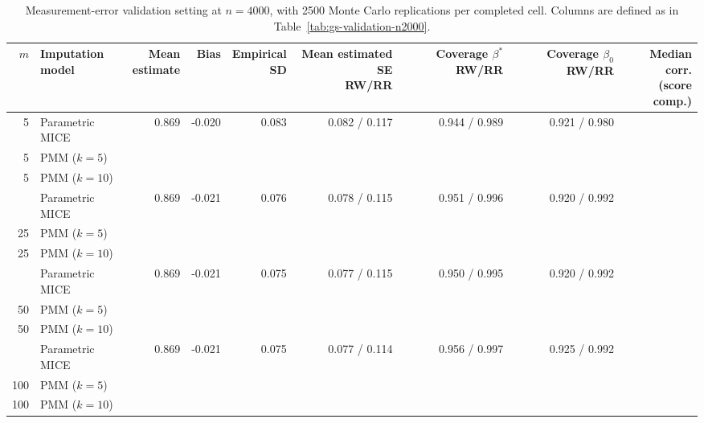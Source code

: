 \begin{table}[!htbp]
\centering
\scriptsize
\setlength{\tabcolsep}{2.5pt}
\begin{tabular}{rlrrrrrrr}
\toprule
\(m\) & \makecell{Imputation\\model} &
\makecell{Mean\\estimate} & Bias &
\makecell{Empirical\\SD} &
\makecell{Mean estimated SE\\RW/RR} &
\makecell{Coverage \(\beta^\ast\)\\RW/RR} &
\makecell{Coverage \(\beta_0\)\\RW/RR} & \makecell{Median corr.\\(score comp.)}\\
\midrule
5   & Parametric MICE & 0.869 & -0.020 & 0.083 & 0.082 / 0.117 & 0.944 / 0.989 & 0.921 / 0.980 &\\
5   & PMM (\(k=5\))  &       &        &       &               &               &               &\\
5   & PMM (\(k=10\)) &       &        &       &               &               &               &\\
\addlinespace[2pt]
25  & Parametric MICE & 0.869 & -0.021 & 0.076 & 0.078 / 0.115 & 0.951 / 0.996 & 0.920 / 0.992 &\\
25  & PMM (\(k=5\))  &       &        &       &               &               &               &\\
25  & PMM (\(k=10\)) &       &        &       &               &               &               &\\
\addlinespace[2pt]
50  & Parametric MICE & 0.869 & -0.021 & 0.075 & 0.077 / 0.115 & 0.950 / 0.995 & 0.920 / 0.992 &\\
50  & PMM (\(k=5\))  &       &        &       &               &               &               &\\
50  & PMM (\(k=10\)) &       &        &       &               &               &               &\\
\addlinespace[2pt]
100 & Parametric MICE & 0.869 & -0.021 & 0.075 & 0.077 / 0.114 & 0.956 / 0.997 & 0.925 / 0.992 &\\
100 & PMM (\(k=5\))  &       &        &       &               &               &               &\\
100 & PMM (\(k=10\)) &       &        &       &               &               &               &\\
\bottomrule
\end{tabular}
\caption{Measurement-error validation setting at \(n=4000\), with 2500
Monte Carlo replications per completed cell.  Columns are defined as in
Table~\ref{tab:gs-validation-n2000}.}
\label{tab:gs-validation-n4000}
\end{table}

